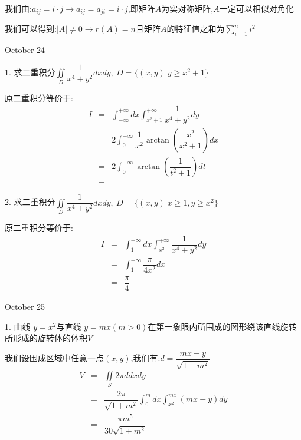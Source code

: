 \begin{solution}

	我们由:$a_{ij}=i\cdot j\to a_{ij}=a_{ji}=i\cdot j$,即矩阵$A$为实对称矩阵,$A$一定可以相似对角化
	
	我们可以得到:$|A|\neq 0\to r(A)=n$且矩阵$A$的特征值之和为$\sum\limits_{i=1}^{n}i^2$
\end{solution}


\textcolor{purplea}{October 24}

1. 求二重积分$\iint\limits_{D}\dfrac{1}{x^4+y^2}dxdy,\ D=\{(x,y)|y\geq x^2+1\}$

\begin{solution}

	原二重积分等价于:
	\begin{eqnarray*}
		I&=&\int_{-\infty}^{+\infty}dx\int_{x^2+1}^{+\infty}\dfrac{1}{x^4+y^2}dy\\
		&=&2\int_{0}^{+\infty}\dfrac{1}{x^2}\arctan(\dfrac{x^2}{x^2+1})dx\\
		&=&2\int_{0}^{+\infty}\arctan(\dfrac{1}{t^2+1})dt\\
		&=&
	\end{eqnarray*}
\end{solution}


2. 求二重积分$\iint\limits_{D}\dfrac{1}{x^4+y^2}dxdy,\ D=\{(x,y)|x\geq 1,y\geq x^2\}$

\begin{solution}

	原二重积分等价于:
	\begin{eqnarray*}
		I&=&\int_{1}^{+\infty}dx\int_{x^2}^{+\infty}\dfrac{1}{x^4+y^2}dy\\
		&=&\int_{1}^{+\infty}\dfrac{\pi}{4x^2}dx\\
		&=&\dfrac{\pi}{4}
	\end{eqnarray*}
\end{solution}


\textcolor{purplea}{October 25}

1. 曲线 $y=x^2$与直线 $y=mx(m>0)$在第一象限内所围成的图形绕该直线旋转所形成的旋转体的体积$V$

\begin{solution}

	我们设围成区域中任意一点$(x,y)$,我们有:$d=\dfrac{mx-y}{\sqrt{1+m^2}}$
	\begin{eqnarray*}
		V&=&\iint\limits_{S}2\pi ddxdy\\
		&=&\dfrac{2\pi}{\sqrt{1+m^2}}\int_{0}^{m}dx\int_{x^2}^{mx}(mx-y)dy\\
		&=&\dfrac{\pi m^5}{30\sqrt{1+m^2}}
	\end{eqnarray*}
\end{solution}


